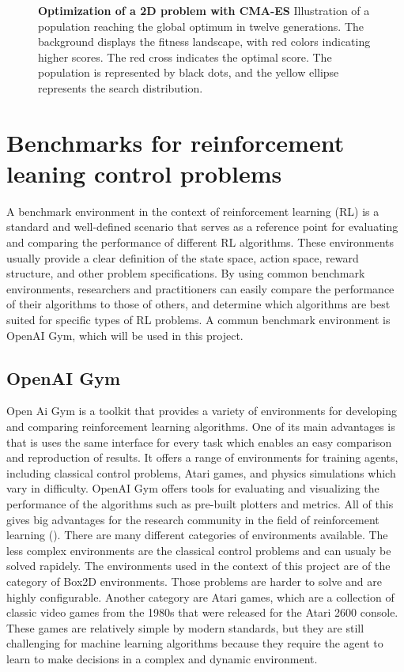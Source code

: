 \begin{figure}[!ht]
\centering
{}
\caption[Optimization of a 2D problem with CMA-ES]{
  \textbf{Optimization of a 2D problem with CMA-ES}
  Illustration of a population reaching the global optimum in twelve generations. The background displays the fitness landscape, with red colors indicating higher scores. The red cross indicates the optimal score. The population is represented by black dots, and the yellow ellipse represents the search distribution.
 }
\label{fig:cma_es}
\end{figure}

\section{Benchmarks for reinforcement leaning control problems}

A benchmark environment in the context of reinforcement learning (RL) is a standard and well-defined scenario that serves as a reference point for evaluating and comparing the performance of different RL algorithms. These environments usually provide a clear definition of the state space, action space, reward structure, and other problem specifications. By using common benchmark environments, researchers and practitioners can easily compare the performance of their algorithms to those of others, and determine which algorithms are best suited for specific types of RL problems. A commun benchmark environment is OpenAI Gym, which will be used in this project.

\subsection{OpenAI Gym}

Open Ai Gym is a toolkit that provides a variety of environments for developing and comparing reinforcement learning algorithms. One of its main advantages is that is uses the same interface for every task which enables an easy comparison and reproduction of results. It offers a range of environments for training agents, including classical control problems, Atari games, and physics simulations which vary in difficulty. OpenAI Gym offers tools for evaluating and visualizing the performance of the algorithms such as pre-built plotters and metrics. All of this gives big advantages for the research community in the field of reinforcement learning (\cite{noauthor_openai_2016}). There are many different categories of environments available. The less complex environments are the classical control problems and can usualy be solved rapidely. The environments used in the context of this project are of the category of Box2D environments. Those problems are harder to solve and are highly configurable. Another category are Atari games, which are a collection of classic video games from the 1980s that were released for the Atari 2600 console. These games are relatively simple by modern standards, but they are still challenging for machine learning algorithms because they require the agent to learn to make decisions in a complex and dynamic environment.

